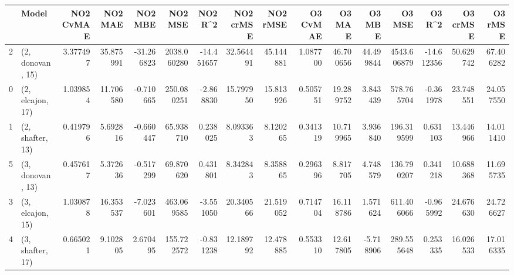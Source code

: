 \begin{tabular}{llrrrrrrrrrrrrrr}
\toprule
{} &             Model &  NO2 CvMAE &    NO2 MAE &    NO2 MBE &      NO2 MSE &    NO2 R\textasciicircum2 &  NO2 crMSE &   NO2 rMSE &  O3 CvMAE &     O3 MAE &     O3 MBE &       O3 MSE &     O3 R\textasciicircum2 &   O3 crMSE &    O3 rMSE \\
\midrule
2 &  (2, donovan, 15) &   3.377497 &  35.875991 & -31.266823 &  2038.060280 & -14.451657 &  32.564491 &  45.144881 &  1.087700 &  46.700656 &  44.499844 &  4543.606879 & -14.612356 &  50.629742 &  67.406282 \\
0 &  (2, elcajon, 17) &   1.039854 &  11.706580 &  -0.710665 &   250.080251 &  -2.868830 &  15.797950 &  15.813926 &  0.505751 &  19.289752 &   3.843439 &   578.765704 &  -0.361978 &  23.748551 &  24.057550 \\
1 &  (2, shafter, 13) &   0.419796 &   5.692816 &  -0.660447 &    65.938710 &   0.238025 &   8.093363 &   8.120265 &  0.341319 &  10.719965 &   3.936840 &   196.319599 &   0.631103 &  13.446966 &  14.011410 \\
5 &  (3, donovan, 13) &   0.457617 &   5.372636 &  -0.517299 &    69.870620 &   0.431801 &   8.342843 &   8.358865 &  0.296396 &   8.817705 &   4.748579 &   136.790207 &   0.341218 &  10.688368 &  11.695735 \\
3 &  (3, elcajon, 15) &   1.030878 &  16.353537 &  -7.023601 &   463.069585 &  -3.551050 &  20.340566 &  21.519052 &  0.714704 &  16.118786 &   1.571624 &   611.406066 &  -0.965992 &  24.676630 &  24.726627 \\
4 &  (3, shafter, 17) &   0.665021 &   9.102805 &   2.670495 &   155.722572 &  -0.831238 &  12.189792 &  12.478885 &  0.553310 &  12.617805 &  -5.718906 &   289.555648 &   0.253335 &  16.026533 &  17.016335 \\
\bottomrule
\end{tabular}
